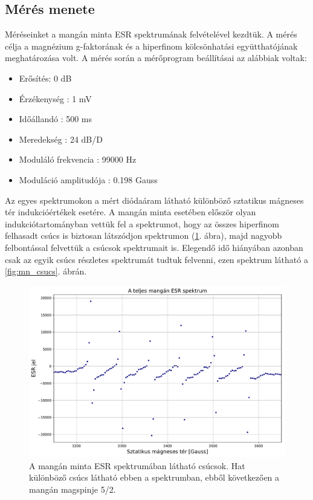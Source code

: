 \documentclass[12pt,a4paper]{article}
\begin{document}
\subsection{Mérés menete}
\hspace*{10pt} Méréseinket a mangán minta ESR spektrumának felvételével kezdtük. A mérés célja a magnézium g-faktorának és a hiperfinom kölcsönhatási együtthatójának meghatározása volt. A mérés során a mérőprogram beállításai az alábbiak voltak:
\begin{itemize}
\item{Erősítés:  0 dB}
\item{Érzékenység : 1 mV}
\item{Időállandó : 500 ms}
\item{Meredekség : 24 dB/D}
\item{Moduláló frekvencia : 99000 Hz}
\item{Moduláció amplitudója : 0.198 Gauss}
\end{itemize} Az egyes spektrumokon a mért diódaáram látható különböző sztatikus mágneses tér indukcióértékek esetére. A mangán minta esetében először olyan indukciótartományban vettük fel a spektrumot, hogy az összes hiperfinom felhasadt csúcs is biztosan látszódjon spektrumon (\ref{fig:mn_teljes}. ábra), majd nagyobb felbontással felvettük a csúcsok spektrumait is. Elegendő idő hiányában azonban csak az egyik csúcs részletes spektrumát tudtuk felvenni, ezen spektrum látható a \ref{fig:mn_csucs}. ábrán.\\
\begin{figure}[!h]
\centering
\includegraphics[scale=0.5]{mang_teljes}
\caption{A mangán minta ESR spektrumában látható csúcsok. Hat különböző csúcs látható ebben a spektrumban, ebből következően a mangán magspinje 5/2.}
\label{fig:mn_teljes}
\end{figure}
\end{document}

